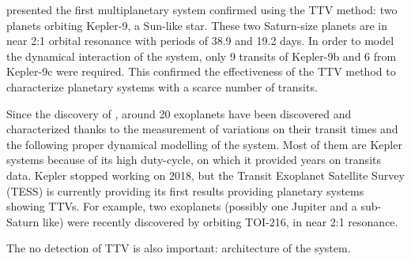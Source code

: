 \cite{Holman2010} presented the first multiplanetary system confirmed using the TTV method: two planets orbiting Kepler-9, a Sun-like star. These two Saturn-size planets are in near 2:1 orbital resonance with periods of 38.9 and 19.2 days. In order to model the dynamical interaction of the system, only 9 transits of Kepler-9b and 6 from Kepler-9c were required. This confirmed the effectiveness of the TTV method to characterize planetary systems with a scarce number of transits.

Since the discovery of \cite{Holman2010}, around 20 exoplanets have been discovered and characterized thanks to the measurement of variations on their transit times and the following proper dynamical modelling of the system. Most of them are Kepler systems because of its high duty-cycle, on which it provided years on transits data. Kepler stopped working on 2018, but the Transit Exoplanet Satellite Survey (TESS) is currently providing its first results providing planetary systems showing TTVs.  For example, two exoplanets (possibly one Jupiter and a sub-Saturn like) were recently discovered by \cite{Dawson2019} orbiting TOI-216, in near 2:1 resonance. 

The no detection of TTV is also important: architecture of the system.


